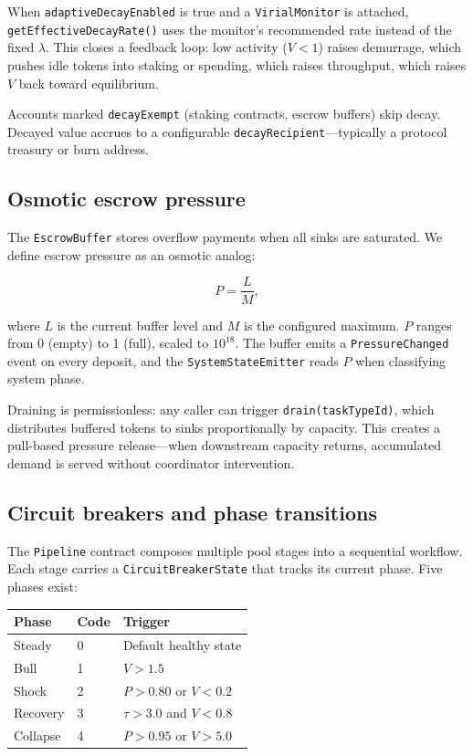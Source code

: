 When \texttt{adaptiveDecayEnabled} is true and a
\texttt{VirialMonitor} is attached, \texttt{getEffectiveDecayRate()}
uses the monitor's recommended rate instead of the fixed $\lambda$.
This closes a feedback loop: low activity ($V < 1$) raises demurrage,
which pushes idle tokens into staking or spending, which raises
throughput, which raises $V$ back toward equilibrium.

Accounts marked \texttt{decayExempt} (staking contracts, escrow
buffers) skip decay. Decayed value accrues to a configurable
\texttt{decayRecipient}---typically a protocol treasury or burn
address.

\subsection{Osmotic escrow pressure}
\label{sec:osmotic}

The \texttt{EscrowBuffer} stores overflow payments when all sinks are
saturated. We define escrow pressure as an osmotic analog:

\begin{equation}
  P = \frac{L}{M},
  \label{eq:pressure}
\end{equation}

\noindent where $L$ is the current buffer level and $M$ is the
configured maximum. $P$ ranges from 0 (empty) to 1 (full), scaled to
$10^{18}$. The buffer emits a \texttt{PressureChanged} event on every
deposit, and the \texttt{SystemStateEmitter} reads $P$ when
classifying system phase.

Draining is permissionless: any caller can trigger
\texttt{drain(taskTypeId)}, which distributes buffered tokens to sinks
proportionally by capacity. This creates a pull-based pressure
release---when downstream capacity returns, accumulated demand is
served without coordinator intervention.

\subsection{Circuit breakers and phase transitions}
\label{sec:breakers}

The \texttt{Pipeline} contract composes multiple pool stages into a
sequential workflow. Each stage carries a \texttt{CircuitBreakerState}
that tracks its current phase. Five phases exist:

\begin{center}
\begin{tabular}{lll}
\toprule
\textbf{Phase} & \textbf{Code} & \textbf{Trigger} \\
\midrule
Steady     & 0 & Default healthy state \\
Bull       & 1 & $V > 1.5$ \\
Shock      & 2 & $P > 0.80$ or $V < 0.2$ \\
Recovery   & 3 & $\tau > 3.0$ and $V < 0.8$ \\
Collapse   & 4 & $P > 0.95$ or $V > 5.0$ \\
\bottomrule
\end{tabular}
\end{center}

